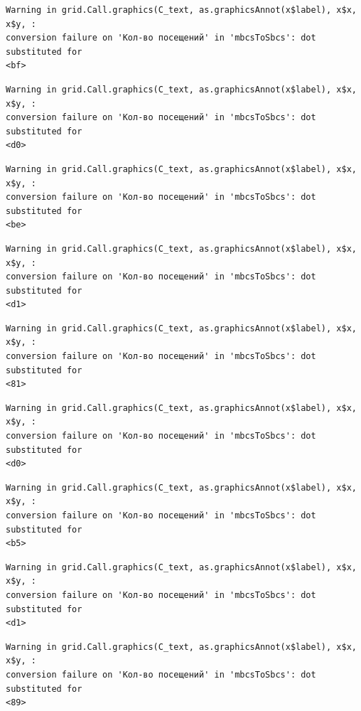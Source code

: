 \documentclass[
  letterpaper,
  DIV=11,
  numbers=noendperiod]{scrartcl}
\begin{document}
\begin{verbatim}
Warning in grid.Call.graphics(C_text, as.graphicsAnnot(x$label), x$x, x$y, :
conversion failure on 'Кол-во посещений' in 'mbcsToSbcs': dot substituted for
<bf>
\end{verbatim}

\begin{verbatim}
Warning in grid.Call.graphics(C_text, as.graphicsAnnot(x$label), x$x, x$y, :
conversion failure on 'Кол-во посещений' in 'mbcsToSbcs': dot substituted for
<d0>
\end{verbatim}

\begin{verbatim}
Warning in grid.Call.graphics(C_text, as.graphicsAnnot(x$label), x$x, x$y, :
conversion failure on 'Кол-во посещений' in 'mbcsToSbcs': dot substituted for
<be>
\end{verbatim}

\begin{verbatim}
Warning in grid.Call.graphics(C_text, as.graphicsAnnot(x$label), x$x, x$y, :
conversion failure on 'Кол-во посещений' in 'mbcsToSbcs': dot substituted for
<d1>
\end{verbatim}

\begin{verbatim}
Warning in grid.Call.graphics(C_text, as.graphicsAnnot(x$label), x$x, x$y, :
conversion failure on 'Кол-во посещений' in 'mbcsToSbcs': dot substituted for
<81>
\end{verbatim}

\begin{verbatim}
Warning in grid.Call.graphics(C_text, as.graphicsAnnot(x$label), x$x, x$y, :
conversion failure on 'Кол-во посещений' in 'mbcsToSbcs': dot substituted for
<d0>
\end{verbatim}

\begin{verbatim}
Warning in grid.Call.graphics(C_text, as.graphicsAnnot(x$label), x$x, x$y, :
conversion failure on 'Кол-во посещений' in 'mbcsToSbcs': dot substituted for
<b5>
\end{verbatim}

\begin{verbatim}
Warning in grid.Call.graphics(C_text, as.graphicsAnnot(x$label), x$x, x$y, :
conversion failure on 'Кол-во посещений' in 'mbcsToSbcs': dot substituted for
<d1>
\end{verbatim}

\begin{verbatim}
Warning in grid.Call.graphics(C_text, as.graphicsAnnot(x$label), x$x, x$y, :
conversion failure on 'Кол-во посещений' in 'mbcsToSbcs': dot substituted for
<89>
\end{verbatim}
\end{document}
